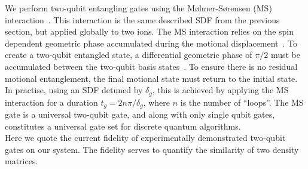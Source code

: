     We perform two-qubit entangling gates using the Mølmer-Sørensen (MS)
    interaction~\cite{sorensen2000entanglement}. This interaction is the same described SDF from the
    previous section, but applied globally to two ions. The MS interaction
    relies on the spin dependent geometric phase accumulated during the motional
    displacement~\cite{ozeri2011tutorial}. To create a two-qubit entangled state, a differential
    geometric phase of $\pi/2$ must be accumulated between the two-qubit basis
    states~\cite{ozeri2011tutorial}. To ensure there is no residual motional entanglement, the final
    motional state must return to the initial state. In practise, using an SDF
    detuned by $\delta_g$, this is achieved by applying the MS interaction for a
    duration $t_g = 2n\pi/\delta_g$, where $n$ is the number of ``loops''. The MS gate is a universal two-qubit gate, and
    along with only single qubit gates, constitutes a universal gate set for
    discrete quantum algorithms.\\  
    Here we quote the current fidelity of experimentally demonstrated two-qubit gates on
    our system. The fidelity serves to quantify the similarity of
    two density matrices. 
